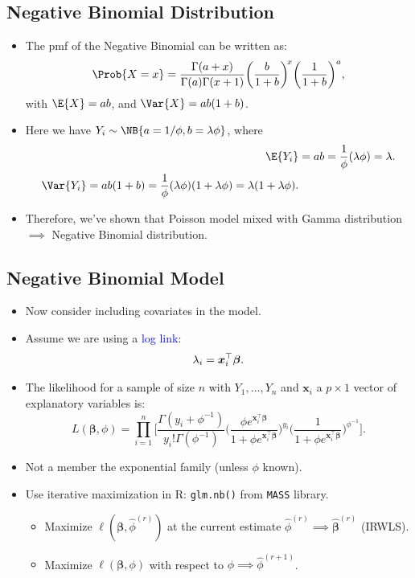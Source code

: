\documentclass{article}\usepackage[]{graphicx}\usepackage[svgnames]{xcolor}
\let\log\relax%
\providecommand{\Vector}[1]{\bm{#1}}%
\begin{document}
\subsection*{Negative Binomial Distribution}
\begin{itemize}
      \item The pmf of the Negative Binomial can be written as:
            \[ \Prob{X=x}=\frac{\Gamma(a+x)}{\Gamma(a)\Gamma(x+1)}\biggl(\frac{b}{1+b}\biggr)^{\!x}\biggl(\frac{1}{1+b}\biggr)^{a}, \]
            with $ \E{X}=ab $, and $ \Var{X}=ab(1+b) $.
      \item Here we have $ Y_i \sim \NB{a=1/\phi,b=\lambda\phi} $, where
            \begin{align*}
                  \E{Y_i} & =ab=\frac{1}{\phi}(\lambda\phi)=\lambda. \\
                  \Var{Y_i}=ab(1+b)=\frac{1}{\phi}(\lambda\phi)(1+\lambda\phi)=\lambda(1+\lambda\phi).
            \end{align*}
      \item Therefore, we've shown that Poisson model mixed with Gamma distribution $ \implies $ Negative Binomial distribution.
\end{itemize}
\subsection*{Negative Binomial Model}
\begin{itemize}
      \item Now consider including covariates in the model.
      \item Assume we are using a \textcolor{Blue}{log link}:
            \[ \log{\lambda_i}=\Vector{x}_i^\top \Vector{\beta}. \]
      \item The likelihood for a sample of size $ n $ with $ Y_1,\ldots,Y_n $ and $ \Vector{x}_i $ a $ p\times 1 $ vector of explanatory
            variables is:
            \[ L(\Vector{\beta},\phi)=\prod_{i=1}^n
                  \biggl[\frac{\Gamma(y_i+\phi^{-1})}{y_i!\Gamma(\phi^{-1})}
                  \biggl(\frac{\phi e^{\Vector{x}_i^\top \Vector{\beta}}}{1+\phi e^{\Vector{x}_i^\top \Vector{\beta}}}\biggr)^{\!y_i}
                  \biggl(\frac{1}{1+\phi e^{\Vector{x}_i^\top \Vector{\beta}}}\biggr)^{\!\phi^{-1}}
                  \biggr]. \]
      \item Not a member the exponential family (unless $ \phi $ known).
      \item Use iterative maximization in R: \texttt{glm.nb()} from \texttt{MASS} library.
            \begin{itemize}
                  \item Maximize $ \ell(\Vector{\beta},\hat{\phi}^{(r)}) $ at the current estimate $ \hat{\phi}^{(r)}\implies \hat{\Vector{\beta}}^{(r)} $ (IRWLS).
                  \item Maximize $ \ell(\Vector{\beta},\phi) $ with respect to $ \phi\implies \hat{\phi}^{(r+1)} $.
            \end{itemize}
\end{itemize}
\end{document}
